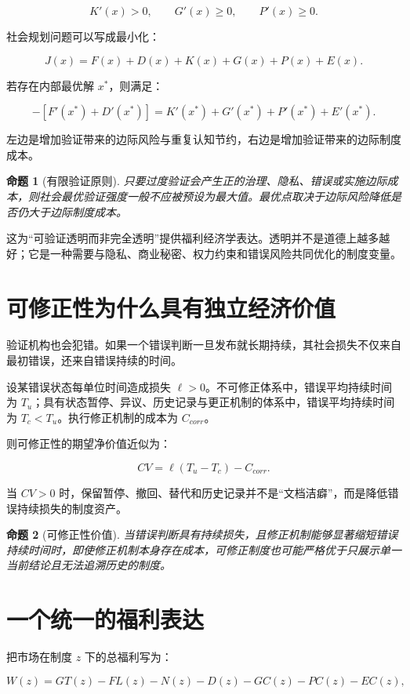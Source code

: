 \documentclass[UTF8,12pt]{ctexart}
\newtheorem{proposition}{命题}
\begin{document}
\[
K'(x)>0,\qquad G'(x)\geq0,\qquad P'(x)\geq0.
\]

社会规划问题可以写成最小化：

\[
J(x)=F(x)+D(x)+K(x)+G(x)+P(x)+E(x).
\]

若存在内部最优解 $x^*$，则满足：

\[
-[F'(x^*)+D'(x^*)]
=K'(x^*)+G'(x^*)+P'(x^*)+E'(x^*).
\]

左边是增加验证带来的边际风险与重复认知节约，右边是增加验证带来的边际制度成本。

\begin{proposition}[有限验证原则]
只要过度验证会产生正的治理、隐私、错误或实施边际成本，则社会最优验证强度一般不应被预设为最大值。最优点取决于边际风险降低是否仍大于边际制度成本。
\end{proposition}

这为“可验证透明而非完全透明”提供福利经济学表达。透明并不是道德上越多越好；它是一种需要与隐私、商业秘密、权力约束和错误风险共同优化的制度变量。

\section{可修正性为什么具有独立经济价值}

验证机构也会犯错。如果一个错误判断一旦发布就长期持续，其社会损失不仅来自最初错误，还来自错误持续的时间。

设某错误状态每单位时间造成损失 $\ell>0$。不可修正体系中，错误平均持续时间为 $T_u$；具有状态暂停、异议、历史记录与更正机制的体系中，错误平均持续时间为 $T_c<T_u$。执行修正机制的成本为 $C_{corr}$。

则可修正性的期望净价值近似为：

\[
CV=\ell(T_u-T_c)-C_{corr}.
\]

当 $CV>0$ 时，保留暂停、撤回、替代和历史记录并不是“文档洁癖”，而是降低错误持续损失的制度资产。

\begin{proposition}[可修正性价值]
当错误判断具有持续损失，且修正机制能够显著缩短错误持续时间时，即使修正机制本身存在成本，可修正制度也可能严格优于只展示单一当前结论且无法追溯历史的制度。
\end{proposition}

\section{一个统一的福利表达}

把市场在制度 $z$ 下的总福利写为：

\[
W(z)=GT(z)-FL(z)-N(z)-D(z)-GC(z)-PC(z)-EC(z),
\]
\end{document}

